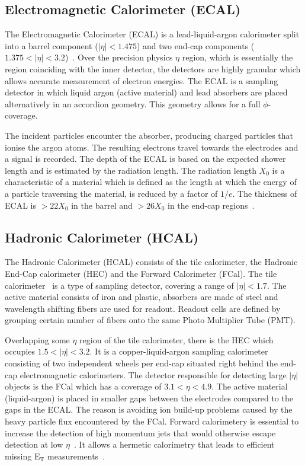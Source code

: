 \subsection*{Electromagnetic Calorimeter (ECAL)}
The Electromagnetic Calorimeter (ECAL) is a lead-liquid-argon calorimeter split into a 
barrel component ($|\eta|<1.475$) and two end-cap components 
($1.375 < |\eta| < 3.2$)~\cite{TheATLASCollaboration_2008}. Over the precision physics 
$\eta$ region, which is essentially the region coinciding with the inner detector, the 
detectors are highly granular which allows accurate measurement of electron energies.
The ECAL is a sampling detector in which liquid argon (active material) and lead absorbers are placed 
alternatively in an accordion geometry. This geometry allows for a full 
$\phi$-coverage. 

The incident particles encounter the absorber, producing charged particles that ionise the argon atoms. The resulting electrons travel towards the electrodes and a
signal is recorded. The depth of the ECAL is based on the expected shower length and is estimated
by the radiation length. The radiation length $X_0$ is a characteristic of a material which is defined as 
the length at which the energy of a particle traversing the material, is reduced by a factor of $1/e$. The thickness of ECAL is $> 22 X_0$ in the barrel and $> 26 X_0$ in the end-cap
regions~\cite{CERN-LHCC-2017-018}.

\subsection*{Hadronic Calorimeter (HCAL)}
The Hadronic Calorimeter (HCAL) consists of the tile calorimeter, the Hadronic End-Cap calorimeter (HEC)
and the Forward Calorimeter (FCal). The tile calorimeter~\cite{Francavilla_2012} is a type of sampling
detector, covering a range of $|\eta|<1.7$. The active material consists of iron and plastic, 
absorbers are made of steel and wavelength shifting fibers are used for readout.
Readout cells are defined by grouping certain number of fibers onto the same Photo Multiplier 
Tube (PMT). 

Overlapping some $\eta$ region of the tile calorimeter, there is the HEC which occupies
$1.5 < |\eta| < 3.2$. It is a copper-liquid-argon sampling calorimeter consisting of two independent wheels per end-cap situated right behind the end-cap electromagnetic
calorimeters. The detector responsible for detecting large $|\eta|$ objects is the FCal which has a coverage of $3.1 < \eta < 4.9$. The active material (liquid-argon) is 
placed in smaller gaps between the electrodes compared to the gaps in the ECAL. The reason is avoiding
ion build-up problems caused by the heavy particle flux 
encountered by the FCal. Forward calorimetery is essential to increase the detection of high momentum jets that would otherwise escape detection at low 
$\eta$~\cite{J-P-Archambault_2008}. It allows a hermetic calorimetry that leads to efficient missing
$\text{E}_\text{T}$ measurements~\cite{A-Artamonov_2008}.
 


